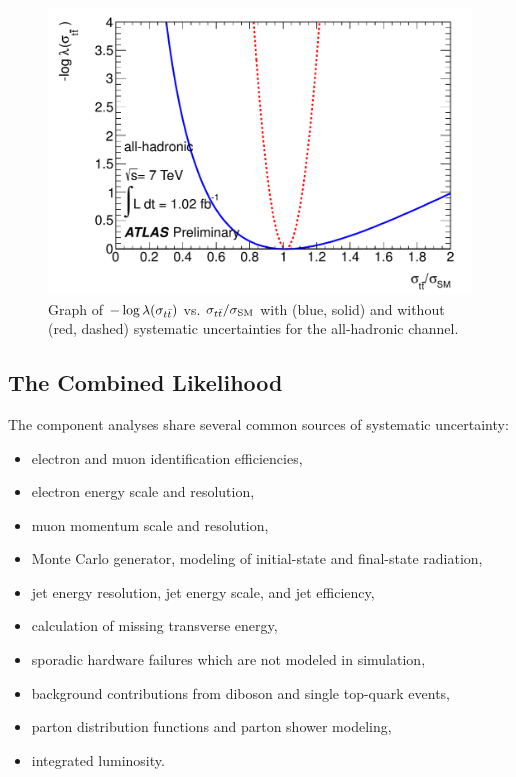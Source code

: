 \begin{figure}[htbp]
  \begin{center}
    \includegraphics[width=.40\textwidth]{figures/comb/allhadronic_likelihood_curve}
  \caption{Graph of $-\log\lambda(\sigma_{t\bar{t}})$ vs. $\sigma_{t\bar{t}}/\sigma_{\rm SM}$ with (blue, solid) and without (red, dashed) systematic uncertainties for the all-hadronic channel.}
  \label{fig:allhad_likelihood}
  \end{center}
\end{figure}



\subsection{The Combined Likelihood}
\label{sec:comb}

The component analyses share several common sources of systematic uncertainty:
\begin{itemize}
\item electron and muon identification efficiencies,
\item electron energy scale and resolution,
\item muon momentum scale and resolution,
\item Monte Carlo generator, modeling of initial-state and final-state radiation,
\item jet energy resolution, jet energy scale, and jet efficiency,
\item calculation of missing transverse energy,
\item sporadic hardware failures which are not modeled in simulation,
\item background contributions from diboson and single top-quark events,
\item parton distribution functions and parton shower modeling,
\item integrated luminosity.
\end{itemize}


